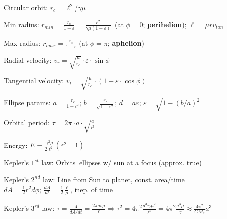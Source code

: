 \documentclass[letterpaper,landscape,10pt]{article}
\newenvironment{mydescription}
{\begin{description}
	\setlength{\itemsep}{0pt}
	\setlength{\parskip}{0pt}
	\setlength{\parsep}{-1pt}}
{\end{description}}
\begin{document}
{\begin{multicols}{3}
\begin{mydescription}
		  \item[Circular orbit:] $r_c=\ell^2/\gamma\mu$
		  \item[Min radius:] $r_{min}=\frac{r_c}{1+\varepsilon}=\frac{\ell^2}{\gamma\mu(1+\varepsilon)}$ (at $\phi=0$; \textbf{perihelion}); $\ell=\mu rv_{tan}$
		  \item[Max radius:] $r_{max}=\frac{r_c}{1-\varepsilon}$ (at $\phi=\pi$; \textbf{aphelion})
		  \item[Radial velocity:]$v_r = \sqrt{\frac{\mu}{r_c}}\cdot\varepsilon\cdot\sin\phi$
		  \item[Tangential velocity:]$v_t = \sqrt{\frac{\mu}{r_c}}\cdot\left(1+\varepsilon\cdot\cos\phi\right)$
		  \item[Ellipse params:] $a=\frac{r_c}{1-\varepsilon^2}$; $b=\frac{r_c}{\sqrt{1-\varepsilon^2}}$; $d=a\varepsilon$; $\varepsilon=\sqrt{1-(b/a)^2}$
		  \item[Orbital period:] $\tau=2\pi\cdot a\cdot\sqrt{\frac{a}{\mu}}$
		  \item[Energy:] $E=\frac{\gamma^2\mu}{2\ell^2}(\varepsilon^2-1)$
		  \item[Kepler's $1^{st}$ law:] Orbits: ellipses w/ sun at a focus (approx. true)
		  \item[Kepler's $2^{nd}$ law:] Line from Sun to planet, const. area/time\\
			$dA=\frac{1}{2}r^2d\phi$; $\frac{dA}{dt}=\frac{1}{2}\frac{\ell}{\mu}$, inep. of time
		  \item[Kepler's $3^{rd}$ law:] $\tau=\frac{A}{dA/dt}=\frac{2\pi ab\mu}{\ell} \Rightarrow \tau^2=4\pi^2\frac{a^3r_c\mu^2}{\ell^2}=4\pi^2\frac{a^3\mu}{\gamma}\approx \frac{4\pi^2}{GM_s}a^3$
		\end{mydescription}



\end{multicols}}
\end{document}

